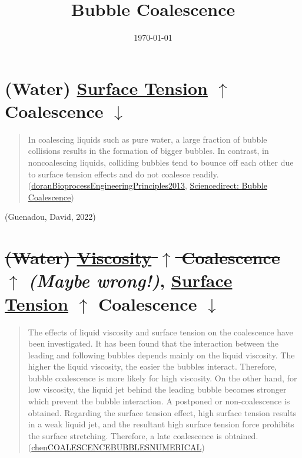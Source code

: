 \documentclass[11pt]{article}
\date{\today}
\title{Bubble Coalescence}
\begin{document}
\maketitle
\tableofcontents

\section{(Water) \href{20240312202630-surface_tension.org}{Surface Tension} \(\uparrow\) Coalescence \(\downarrow\)}
\label{sec:orge7d1ecb}
\begin{quote}
In coalescing liquids such as pure water, a large fraction of bubble collisions results in the formation of bigger bubbles. In contrast, in noncoalescing liquids, colliding bubbles tend to bounce off each other due to surface tension effects and do not coalesce readily. (\href{20240313123708-bioprocess_engineering_principles.org}{doranBioprocessEngineeringPrinciples2013}, \href{https://www.sciencedirect.com/topics/engineering/bubble-coalescence}{Sciencedirect: Bubble Coalescence})
\end{quote}
(Guenadou, David, 2022)
\section{\sout{(Water) \href{20240313140039-viscosity.org}{Viscosity} \(\uparrow\) Coalescence \(\uparrow\)} \emph{(Maybe wrong!)}, \href{20240312202630-surface_tension.org}{Surface Tension} \(\uparrow\) Coalescence \(\downarrow\)}
\label{sec:org100d0ca}
\begin{quote}
The effects of liquid viscosity and surface tension on the coalescence have been investigated. It has been found that the interaction between the leading and following bubbles depends mainly on the liquid viscosity. The higher the liquid viscosity, the easier the bubbles interact. Therefore, bubble coalescence is more likely for high viscosity. On the other hand, for low viscosity, the liquid jet behind the leading bubble becomes stronger which prevent the bubble interaction. A postponed or non-coalescence is obtained. Regarding the surface tension effect, high surface tension results in a weak liquid jet, and the resultant high surface tension force prohibits the surface stretching. Therefore, a late coalescence is obtained. (\href{20240313132557-the_coalescence_of_bubbles_a_numerical_study.org}{chenCOALESCENCEBUBBLESNUMERICAL})
\end{quote}
\end{document}

